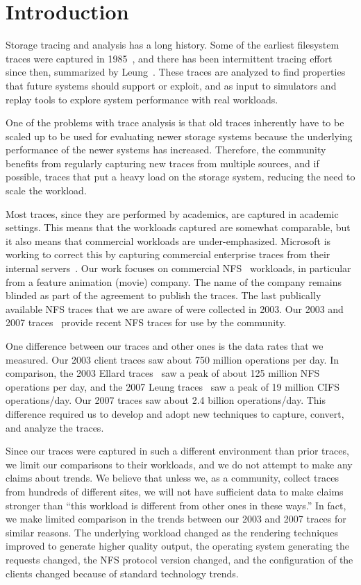 \section{Introduction}

Storage tracing and analysis has a long history.  Some of the earliest
filesystem traces were captured in 1985~\cite{ousterhout85}, and there
has been intermittent tracing effort since then, summarized by
Leung~\cite{LeungUsenix08}.  These traces are
analyzed to find properties that future systems should support or
exploit, and as input to simulators and replay tools to explore system
performance with real workloads.

One of the problems
with trace analysis is that old traces inherently have to be scaled up
to be used for evaluating newer storage systems because the
underlying performance of the newer systems has increased.  Therefore,
the community benefits from regularly capturing new traces from multiple
sources, and if possible, traces that put a heavy load on the storage
system, reducing the need to scale the workload.

Most traces, since they are performed by academics, are captured in
academic settings.  This means that the workloads captured are
somewhat comparable, but it also means that commercial workloads are
under-emphasized.  Microsoft is working to correct this by capturing
commercial enterprise traces from their internal
servers~\cite{snia-iotta-microsoft}.  Our work focuses on commercial
NFS~\cite{rfc1094nfs,rfc1813nfsv3,Pawlowski94nfs3} workloads, in particular from a feature animation (movie) company.
The name of the company remains blinded as part of the agreement to
publish the traces.  The last publically available NFS traces that we
are aware of were collected in 2003.  Our 2003 and 2007
traces~\cite{animation-bear-traces} provide recent NFS traces for use
by the community.

One difference between our traces and other ones is the data rates
that we measured.  Our 2003 client traces saw about 750 million
operations per day.  In comparison, the 2003 Ellard
traces~\cite{EllardLisa03} saw a peak of about 125 million NFS
operations per day, and the 2007 Leung traces~\cite{LeungUsenix08}
saw a peak of 19 million CIFS operations/day.  Our 2007 traces saw
about 2.4 billion operations/day.  This difference required us to
develop and adopt new techniques to capture, convert, and analyze the
traces.

Since our traces were captured in such a different environment than
prior traces, we limit our comparisons to their workloads, and we
do not attempt to make any claims about trends.  We believe that
unless we, as a community, collect traces from hundreds of different
sites, we will not have sufficient data to make claims stronger than
``this workload is different from other ones in these ways.''  In
fact, we make limited comparison in the trends between our 2003 and
2007 traces for similar reasons.  The underlying workload changed
as the rendering techniques improved to generate higher quality output,
the operating system generating the requests changed, the NFS
protocol version changed, and the configuration of the clients 
changed because of standard technology trends.

